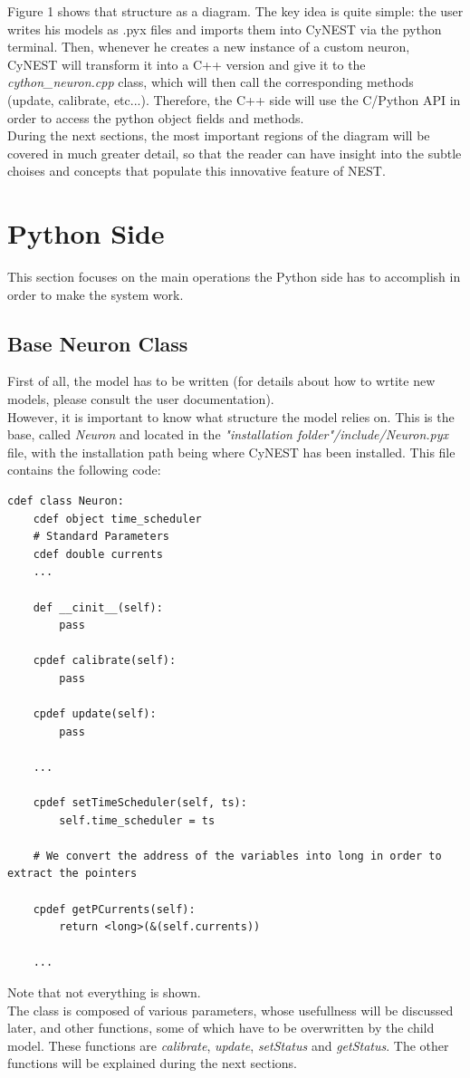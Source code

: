 \documentclass{article}
\begin{document}
Figure 1 shows that structure as a diagram. The key idea is quite simple: the user writes his models as .pyx files and imports them into CyNEST via the python terminal. Then, whenever he creates a new instance of a custom neuron, CyNEST will transform it into a C++ version and give it to the \emph{cython\_neuron.cpp} class, which will then call the corresponding methods (update, calibrate, etc...). Therefore, the C++ side will use the C/Python API in order to access the python object fields and methods.\\

During the next sections, the most important regions of the diagram will be covered in much greater detail, so that the reader can have insight into the subtle choises and concepts that populate this innovative feature of NEST.



\section{Python Side}
This section focuses on the main operations the Python side has to accomplish in order to make the system work.\\

\subsection{Base Neuron Class}
First of all, the model has to be written (for details about how to wrtite new models, please consult the user documentation).\\
However, it is important to know what structure the model relies on. This is the base, called \emph{Neuron} and located in the \emph{"installation folder"/include/Neuron.pyx} file, with the installation path being where CyNEST has been installed. This file contains the following code:
\begin{verbatim}
cdef class Neuron:
    cdef object time_scheduler
    # Standard Parameters
    cdef double currents
    ...
    
    def __cinit__(self):
        pass

    cpdef calibrate(self):
        pass
        
    cpdef update(self):
        pass
        
    ...
        
    cpdef setTimeScheduler(self, ts):
        self.time_scheduler = ts
       
    # We convert the address of the variables into long in order to extract the pointers

    cpdef getPCurrents(self):
        return <long>(&(self.currents))
        
    ...
\end{verbatim}
Note that not everything is shown.\\
The class is composed of various parameters, whose usefullness will be discussed later, and  other functions, some of which have to be overwritten by the child model. These functions are \emph{calibrate}, \emph{update}, \emph{setStatus} and \emph{getStatus}. The other functions will be explained during the next sections.
\end{document}
